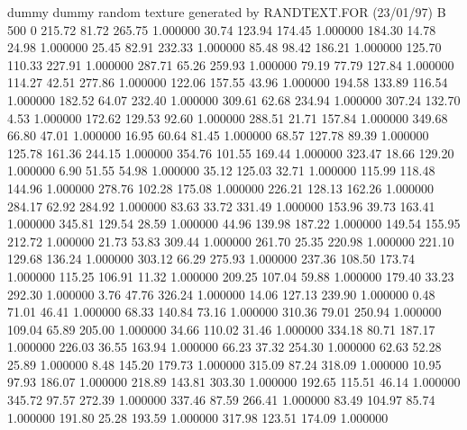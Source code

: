 dummy
dummy
random texture generated by RANDTEXT.FOR (23/01/97)
B   500   0
    215.72     81.72    265.75  1.000000
     30.74    123.94    174.45  1.000000
    184.30     14.78     24.98  1.000000
     25.45     82.91    232.33  1.000000
     85.48     98.42    186.21  1.000000
    125.70    110.33    227.91  1.000000
    287.71     65.26    259.93  1.000000
     79.19     77.79    127.84  1.000000
    114.27     42.51    277.86  1.000000
    122.06    157.55     43.96  1.000000
    194.58    133.89    116.54  1.000000
    182.52     64.07    232.40  1.000000
    309.61     62.68    234.94  1.000000
    307.24    132.70      4.53  1.000000
    172.62    129.53     92.60  1.000000
    288.51     21.71    157.84  1.000000
    349.68     66.80     47.01  1.000000
     16.95     60.64     81.45  1.000000
     68.57    127.78     89.39  1.000000
    125.78    161.36    244.15  1.000000
    354.76    101.55    169.44  1.000000
    323.47     18.66    129.20  1.000000
      6.90     51.55     54.98  1.000000
     35.12    125.03     32.71  1.000000
    115.99    118.48    144.96  1.000000
    278.76    102.28    175.08  1.000000
    226.21    128.13    162.26  1.000000
    284.17     62.92    284.92  1.000000
     83.63     33.72    331.49  1.000000
    153.96     39.73    163.41  1.000000
    345.81    129.54     28.59  1.000000
     44.96    139.98    187.22  1.000000
    149.54    155.95    212.72  1.000000
     21.73     53.83    309.44  1.000000
    261.70     25.35    220.98  1.000000
    221.10    129.68    136.24  1.000000
    303.12     66.29    275.93  1.000000
    237.36    108.50    173.74  1.000000
    115.25    106.91     11.32  1.000000
    209.25    107.04     59.88  1.000000
    179.40     33.23    292.30  1.000000
      3.76     47.76    326.24  1.000000
     14.06    127.13    239.90  1.000000
      0.48     71.01     46.41  1.000000
     68.33    140.84     73.16  1.000000
    310.36     79.01    250.94  1.000000
    109.04     65.89    205.00  1.000000
     34.66    110.02     31.46  1.000000
    334.18     80.71    187.17  1.000000
    226.03     36.55    163.94  1.000000
     66.23     37.32    254.30  1.000000
     62.63     52.28     25.89  1.000000
      8.48    145.20    179.73  1.000000
    315.09     87.24    318.09  1.000000
     10.95     97.93    186.07  1.000000
    218.89    143.81    303.30  1.000000
    192.65    115.51     46.14  1.000000
    345.72     97.57    272.39  1.000000
    337.46     87.59    266.41  1.000000
     83.49    104.97     85.74  1.000000
    191.80     25.28    193.59  1.000000
    317.98    123.51    174.09  1.000000
